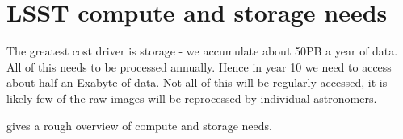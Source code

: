 \section{LSST compute and storage needs}

The greatest cost driver is storage - we accumulate about 50PB a year of data. All of this needs to be processed annually. Hence in year 10 we need to access about half an Exabyte of data. Not all of this will be regularly accessed, it is likely few of the raw images will be reprocessed by individual astronomers.

 gives a rough overview of compute and storage needs.


